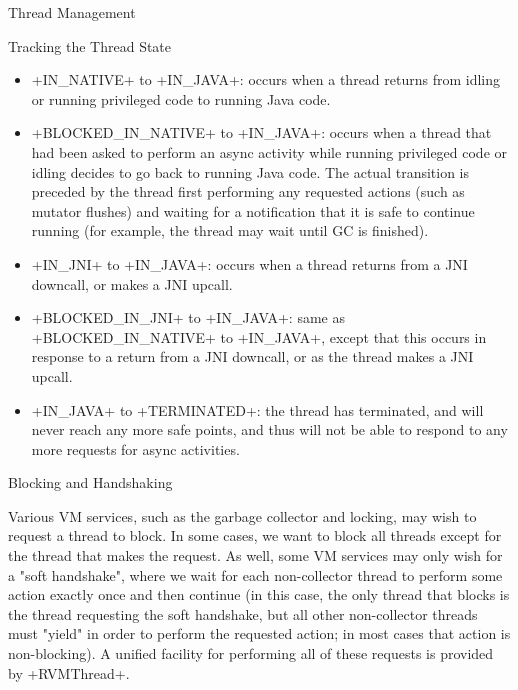 \begin{section}{Thread Management}
\begin{subsection}{Tracking the Thread State}
\begin{itemize}
  \item \spverb+IN_NATIVE+ to \spverb+IN_JAVA+: occurs when a thread returns from idling or running privileged code to running Java code.
  \item \spverb+BLOCKED_IN_NATIVE+ to \spverb+IN_JAVA+: occurs when a thread that had been asked to perform an async activity while running privileged code or idling decides to go back to running Java code. The actual transition is preceded by the thread first performing any requested actions (such as mutator flushes) and waiting for a notification that it is safe to continue running (for example, the thread may wait until GC is finished).
  \item \spverb+IN_JNI+ to \spverb+IN_JAVA+: occurs when a thread returns from a JNI downcall, or makes a JNI upcall.
  \item \spverb+BLOCKED_IN_JNI+ to \spverb+IN_JAVA+: same as \spverb+BLOCKED_IN_NATIVE+ to \spverb+IN_JAVA+, except that this occurs in response to a return from a JNI downcall, or as the thread makes a JNI upcall.
  \item \spverb+IN_JAVA+ to \spverb+TERMINATED+: the thread has terminated, and will never reach any more safe points, and thus will not be able to respond to any more requests for async activities.
\end{itemize}

\end{subsection}

\begin{subsection}{Blocking and Handshaking}

Various VM services, such as the garbage collector and locking, may wish to request a thread to block. In some cases, we want to block all threads except for the thread that makes the request. As well, some VM services may only wish for a "soft handshake", where we wait for each non-collector thread to perform some action exactly once and then continue (in this case, the only thread that blocks is the thread requesting the soft handshake, but all other non-collector threads must "yield" in order to perform the requested action; in most cases that action is non-blocking). A unified facility for performing all of these requests is provided by \spverb+RVMThread+.


\end{subsection}
\end{section}

